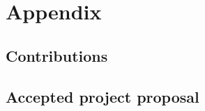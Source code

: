 \documentclass[ twoside,openright,titlepage,numbers=noenddot,headinclude,%
                footinclude=true,cleardoublepage=empty,abstractoff, %
                BCOR=5mm,paper=a4,fontsize=11pt,%
                ngerman,american,%
                ]{scrreprt}
\begin{document}
\part{Appendix}
\chapter{Contributions}


\chapter{Accepted project proposal}


\cleardoublepage
\cleardoublepage
\end{document}
